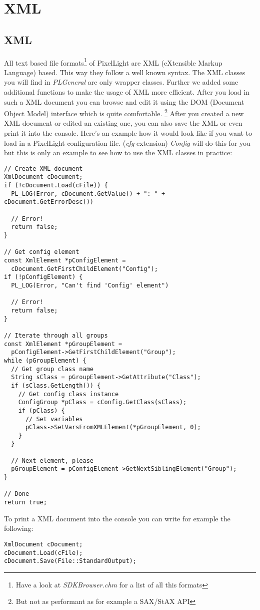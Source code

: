 \chapter{XML}




\section{XML}
All text based file formats\footnote{Have a look at \emph{SDKBrowser.chm} for a list of all this formats} of PixelLight are XML (eXtensible Markup Language) based. This way they follow a well known syntax. The XML classes you will find in \emph{PLGeneral} are only wrapper classes. Further we added some additional functions to make the usage of XML more efficient. After you load in such a XML document you can browse and edit it using the DOM (Document Object Model) interface which is quite comfortable. \footnote{But not as performant as for example a SAX/StAX API} After you created a new XML document or edited an existing one, you can also save the XML or even print it into the console. Here's an example how it would look like if you want to load in a PixelLight configuration file. (\emph{cfg}-extension) \emph{Config} will do this for you but this is only an example to see how to use the XML classes in practice:

\begin{lstlisting}[caption=XML DOM usage example]
// Create XML document
XmlDocument cDocument;
if (!cDocument.Load(cFile)) {
  PL_LOG(Error, cDocument.GetValue() + ": " + cDocument.GetErrorDesc())

  // Error!
  return false;
}

// Get config element
const XmlElement *pConfigElement =
  cDocument.GetFirstChildElement("Config");
if (!pConfigElement) {
  PL_LOG(Error, "Can't find 'Config' element")

  // Error!
  return false;
}

// Iterate through all groups
const XmlElement *pGroupElement =
  pConfigElement->GetFirstChildElement("Group");
while (pGroupElement) {
  // Get group class name
  String sClass = pGroupElement->GetAttribute("Class");
  if (sClass.GetLength()) {
    // Get config class instance
    ConfigGroup *pClass = cConfig.GetClass(sClass);
    if (pClass) {
      // Set variables
      pClass->SetVarsFromXMLElement(*pGroupElement, 0);
    }
  }

  // Next element, please
  pGroupElement = pConfigElement->GetNextSiblingElement("Group");
}

// Done
return true;
\end{lstlisting}

To print a XML document into the console you can write for example the following:

\begin{lstlisting}[caption=Print XML document into the console]
XmlDocument cDocument;
cDocument.Load(cFile);
cDocument.Save(File::StandardOutput);
\end{lstlisting}
